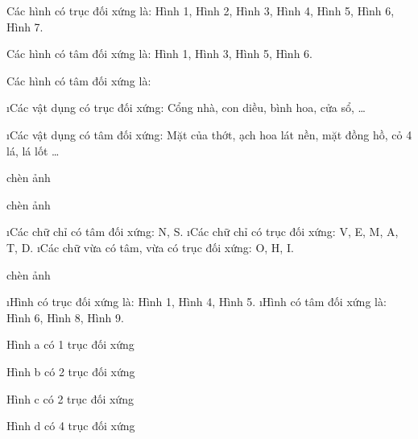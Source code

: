 \begin{Answer}{90}
		Các hình có trục đối xứng là: Hình 1, Hình 2, Hình 3, Hình 4, Hình 5, Hình 6, Hình 7.
		
		Các hình có tâm đối xứng là: Hình 1, Hình 3, Hình 5, Hình 6.
	
\end{Answer}
\begin{Answer}{91}
		Các hình có tâm đối xứng là:
	
\end{Answer}
\begin{Answer}{92}
		\begin{enumerate}[a), leftmargin=*]
			\i Các vật dụng có trục đối xứng: Cổng nhà, con diều, bình  hoa, cửa sổ, \ldots
			
			\i Các vật dụng có tâm đối xứng: Mặt của thớt, ạch hoa lát nền, mặt đồng hồ, cỏ 4 lá, lá lốt \ldots
		\end{enumerate}
	
\end{Answer}
\begin{Answer}{93}
		chèn ảnh
	
\end{Answer}
\begin{Answer}{94}
		chèn ảnh
	
\end{Answer}
\begin{Answer}{95}
		\begin{enumerate}[a), leftmargin=*]
			\i Các chữ chỉ có tâm đối xứng: N, S.
			\i Các chữ chỉ có trục đối xứng: V, E, M, A, T, D.
			\i Các chữ vừa có tâm, vừa có trục đối xứng: O, H, I.
		\end{enumerate}
	
\end{Answer}
\begin{Answer}{96}
		chèn ảnh
	
\end{Answer}
\begin{Answer}{97}
		\begin{enumerate}[a), leftmargin=*]
			\i Hình có trục đối xứng là: Hình 1, Hình  4, Hình  5.
			\i Hình có tâm đối xứng là: Hình 6, Hình 8, Hình  9.
		\end{enumerate}
	
\end{Answer}
\begin{Answer}{98}
		Hình a có 1 trục đối xứng
		
		Hình b có 2 trục đối xứng
		
		Hình c có 2 trục đối xứng
		
		Hình d có 4 trục đối xứng
	
\end{Answer}
